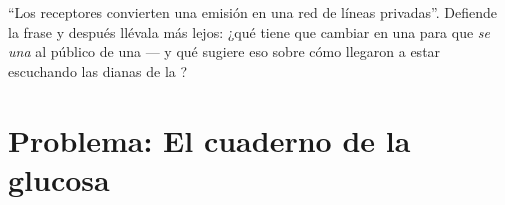 \begin{exercise}[$\star\star\star$]\label{exo:g8:hormonal-communication:12}
``Los receptores convierten una emisión en una red de líneas
privadas''. Defiende la frase y después llévala más lejos: ¿qué tiene
que cambiar en una  para que \emph{se una} al público de una
 --- y qué sugiere eso sobre cómo llegaron a estar escuchando
las dianas de la ?
\end{exercise}

\section{Problema: El cuaderno de la glucosa}

